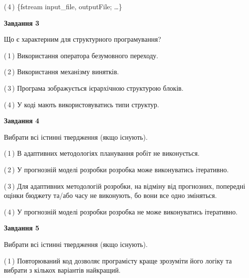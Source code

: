 \documentclass[10pt, ukrainian]{article}
\begin{document}
{\begin {large}
(\,4\,) \{fstream input\_file, outputFile; …\}%


{\begin {center}\textbf{Завдання 3}\end {center}}\par
Що є характерним для структурного програмування?\par
\vspace{2mm}



(\,1\,) Використання оператора безумовного переходу. %



(\,2\,) Використання механізму винятків. %



(\,3\,) Програма зображується ієрархічною структурою блоків.%



(\,4\,) У коді мають використовуватись типи структур. %


{\begin {center}\textbf{Завдання 4}\end {center}}\par
Вибрати всі істинні твердження (якщо існують).\par
\vspace{2mm}



(\,1\,) В адаптивних методологіях планування робіт не виконується. %



(\,2\,) У прогнозній моделі розробки розробка може виконуватись ітеративно. %



(\,3\,) Для адаптивних методологій розробки, на відміну від прогнозних, попередні оцінки бюджету та/або часу не виконують, бо вони все одно зміняться. %



(\,4\,) У прогнозній моделі розробки розробка не може виконуватись ітеративно. %


{\begin {center}\textbf{Завдання 5}\end {center}}\par
Вибрати всі істинні твердження (якщо існують).\par
\vspace{2mm}



(\,1\,) Повторюваний код дозволяє програмісту краще зрозуміти його логіку та вибрати з кількох варіантів найкращий. %




\end{large}}
\end{document}

